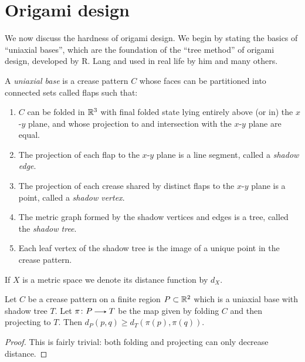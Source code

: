 
\section{Origami design}

We now discuss the hardness of origami design. We begin by stating the
basics of ``uniaxial bases'', which are the foundation of the ``tree
method'' of origami design, developed by R. Lang and used in real life
by him and many others.

\begin{definition}
  A \emph{uniaxial base} is a crease pattern $C$ whose faces can be
  partitioned into connected sets called flaps such that:
  \begin{enumerate}
  \item $C$ can be folded in $\mathbb{R}^3$ with final folded state lying
    entirely above (or in) the $x$-$y$ plane, and whose projection to
    and intersection with the $x$-$y$ plane are equal.
  \item The projection of each flap to the $x$-$y$ plane is a line
    segment, called a \emph{shadow edge}.
  \item The projection of each crease shared by distinct flaps to the
    $x$-$y$ plane is a point, called a \emph{shadow vertex}.
  \item The metric graph formed by the shadow vertices and edges is a
    tree, called the \emph{shadow tree}.
  \item Each leaf vertex of the shadow tree is the image of a unique
    point in the crease pattern.
  \end{enumerate}
\end{definition}

\begin{notation}
  If $X$ is a metric space we denote its distance function by
  $d_X$.
\end{notation}

\begin{lemma}
  \label{trivial}
  Let $C$ be a crease pattern on a finite region $P \subset \mathbb{R}^2$
  which is a uniaxial base with shadow tree $T$. Let $\pi \c P \to T$
  be the map given by folding $C$ and then projecting to $T$. Then
  $d_P(p,q) \ge d_T(\pi(p), \pi(q))$.
\end{lemma}

\begin{proof}
  This is fairly trivial: both folding and projecting can only
  decrease distance.
\end{proof}

